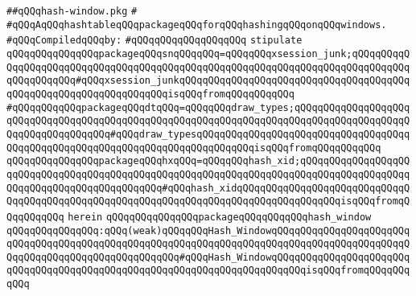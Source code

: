 \label{src/lib/x-kit/xclient/src/window/hash-window.pkg}
\verb|##qQQqhash-window.pkg|\newline
\verb|#|\newline
\verb|#qQQqAqQQqhashtableqQQqpackageqQQqforqQQqhashingqQQqonqQQqwindows.|\newline
\newline
\verb|#qQQqCompiledqQQqby:|\newline
\verb|#qQQqqQQqqQQqqQQqqQQq|\newline
\newline
\newline
\newline
\verb|stipulate|\newline
\verb|qQQqqQQqqQQqqQQqpackageqQQqsnqQQqqQQq=qQQqqQQqxsession_junk;qQQqqQQqqQQqqQQqqQQqqQQqqQQqqQQqqQQqqQQqqQQqqQQqqQQqqQQqqQQqqQQqqQQqqQQqqQQqqQQqqQQqqQQqqQQq#qQQqxsession_junkqQQqqQQqqQQqqQQqqQQqqQQqqQQqqQQqqQQqqQQqqQQqqQQqqQQqqQQqqQQqqQQqqQQqisqQQqfromqQQqqQQqqQQq|\newline
\verb|#qQQqqQQqqQQqpackageqQQqdtqQQq=qQQqqQQqdraw_types;qQQqqQQqqQQqqQQqqQQqqQQqqQQqqQQqqQQqqQQqqQQqqQQqqQQqqQQqqQQqqQQqqQQqqQQqqQQqqQQqqQQqqQQqqQQqqQQqqQQqqQQqqQQq#qQQqdraw_typesqQQqqQQqqQQqqQQqqQQqqQQqqQQqqQQqqQQqqQQqqQQqqQQqqQQqqQQqqQQqqQQqqQQqqQQqqQQqqQQqisqQQqfromqQQqqQQqqQQq|\newline
\verb|qQQqqQQqqQQqqQQqpackageqQQqhxqQQq=qQQqqQQqhash_xid;qQQqqQQqqQQqqQQqqQQqqQQqqQQqqQQqqQQqqQQqqQQqqQQqqQQqqQQqqQQqqQQqqQQqqQQqqQQqqQQqqQQqqQQqqQQqqQQqqQQqqQQqqQQqqQQqqQQq#qQQqhash_xidqQQqqQQqqQQqqQQqqQQqqQQqqQQqqQQqqQQqqQQqqQQqqQQqqQQqqQQqqQQqqQQqqQQqqQQqqQQqqQQqqQQqqQQqisqQQqfromqQQqqQQqqQQq|\newline
\verb|herein|\newline
\newline
\newline
\verb|qQQqqQQqqQQqqQQqpackageqQQqqQQqqQQqhash_window|\newline
\verb|qQQqqQQqqQQqqQQq:qQQq(weak)qQQqqQQqHash_WindowqQQqqQQqqQQqqQQqqQQqqQQqqQQqqQQqqQQqqQQqqQQqqQQqqQQqqQQqqQQqqQQqqQQqqQQqqQQqqQQqqQQqqQQqqQQqqQQqqQQqqQQqqQQqqQQqqQQqqQQqqQQq#qQQqHash_WindowqQQqqQQqqQQqqQQqqQQqqQQqqQQqqQQqqQQqqQQqqQQqqQQqqQQqqQQqqQQqqQQqqQQqqQQqqQQqisqQQqfromqQQqqQQqqQQq|\newline
